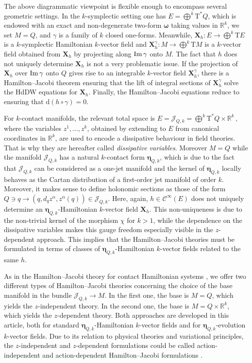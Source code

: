 \documentclass[11pt,twoside]{article}
\theoremstyle{plain}
\theoremstyle{definition}
\theoremstyle{remark}
\newcommand{\dd}{\mathrm{d}}
\newcommand{\Cinfty}{\mathscr{C}^\infty}
\newcommand{\T}{\mathrm{T}}
\begin{document}
The above diagrammatic viewpoint is flexible enough to encompass several geometric settings. In the $k$-symplectic setting \cite{LSV_15} one has $E=\bigoplus^k \T^*Q$, which is endowed with an exact and non-degenerate two-form $\bm \omega$ taking values in $\mathbb{R}^k$, we set $M=Q$, and $\gamma$ is a family of $k$ closed one-forms. Meanwhile, ${\bm X}_h\colon E\to \bigoplus^k\T E$ is a $k$-symplectic Hamiltonian $k$-vector field and ${\bm X}^\gamma_h\colon M\to \bigoplus^k\T M$ is a $k$-vector field obtained from  ${\bm X}_h$ by projecting along ${\rm Im}\,\gamma$ onto $M$. The fact that $h$ does not uniquely determine ${\bm X}_h$ is not a very problematic issue. If the projection of ${\bm X}_h$ over ${\rm Im}\,\gamma$ onto $Q$ gives rise to an integrable $k$-vector field ${\bm X}^\gamma_h$, there is a Hamilton--Jacobi theorem ensuring that the lift of integral sections of ${\bm X}^\gamma_h$ solve the HdDW equations for ${\bm X}_h$. Finally, the Hamilton--Jacobi equations reduce to ensuring that $\dd(h\circ \gamma)=0$.

For $k$-contact manifolds, the relevant total space is
\(
E=\mathcal{J}_{Q,k}=\bigoplus^k \T^*Q\times\mathbb R^k\,,
\)
where the variables $z^1,\dots,z^k$, obtained by extending to $E$ from canonical coordinates in $\mathbb{R}^k$, are used to encode a dissipative behaviour in field theories. That is why they are hereafter called {\it dissipative variables}. Moreover $M=Q$ while the manifold $\mathcal{J}_{Q,k}$ has a natural $k$-contact form ${\bm \eta}_{Q,k}$, which is due to the fact that $\mathcal{J}_{Q,k}$ can be considered as a one-jet manifold \cite{LRS_25} and the kernel of ${\bm \eta}_{Q,k}$ locally behaves as the Cartan distribution of a first-order jet manifold of order $k$.  Moreover, it makes sense to define holonomic sections as those of the form $Q\ni q\rightarrow (q,d_qz^\alpha,z^\alpha(q))\in \mathcal{J}_{Q,k}$. Here, again, $h\in\Cinfty(E)$ does not uniquely determine an $\bm\eta_{Q,k}$-Hamiltonian $k$-vector field ${\bm X}_h$. This non-uniqueness is due to the non-trivial kernel of the morphism $\chi$ for $k>1$, while the dependence on the dissipative variables makes this gauge freedom especially visible in the $z$-dependent approach. This implies that the Hamilton--Jacobi theories must be formulated in terms of classes of ${\bm \eta}_{Q,k}$-Hamiltonian $k$-vector fields related to the same $h$. 

As in the Hamilton--Jacobi theory for contact Hamiltonian systems \cite{LLM_21a,LLGR_23}, we offer two different types of Hamilton--Jacobi theories concerning the choice of the base manifold in the bundle $\mathcal{J}_{Q,k}\rightarrow M$. In the first one, the base is $M=Q$, which yields the $z$-independent theory. In the second one, the base is $M=Q\times\mathbb R^k$, which yields the $z$-dependent theory. Both approaches are developed in this article, both for standard ${\bm \eta}_{Q,k}$-Hamiltonian $k$-vector fields and for ${\bm \eta}_{Q,k}$-evolution   $k$-vector fields. Due to its relation to physical theories and variational principles, the $z$-independent and $z$-dependent formulations could be called action-independent and action-dependent Hamilton--Jacobi formulations \cite{LPAF2018,LPF2019,LPAF2017}.
\end{document}
